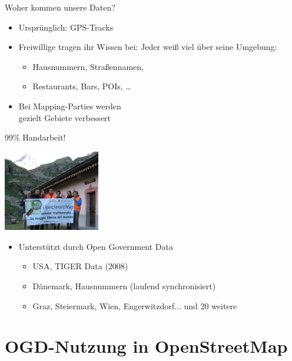 \documentclass{beamer}
\begin{document}
\begin{frame}{Woher kommen unsere Daten?}

\begin{itemize}
  \item Ursprünglich: GPS-Tracks
  \item Freiwillige tragen ihr Wissen bei: Jeder weiß viel über seine Umgebung:
	\begin{itemize}
	  \item Hausnummern, Straßennamen,
	  \item Restaurants, Bars, POIs, \dots
  \end{itemize}
  \pause
  \item Bei Mapping-Parties werden \\ gezielt Gebiete verbessert
\end{itemize}

  \vspace{0.4cm}
 99\% Handarbeit!

  \vspace*{-2.9cm}
 \hfill \includegraphics[width=4.2cm]{alps_mp.jpg}


  \pause
\begin{itemize}
  \item Unterstützt durch Open Government Data
  \begin{itemize}
    \item USA, TIGER Data (2008)
    \item Dänemark, Hausnummern (laufend synchronisiert)
    \item Graz, Steiermark, Wien, Engerwitzdorf... und 20 weitere
  \end{itemize}
\end{itemize}

\end{frame}

\section{OGD-Nutzung in OpenStreetMap}
\end{document}
